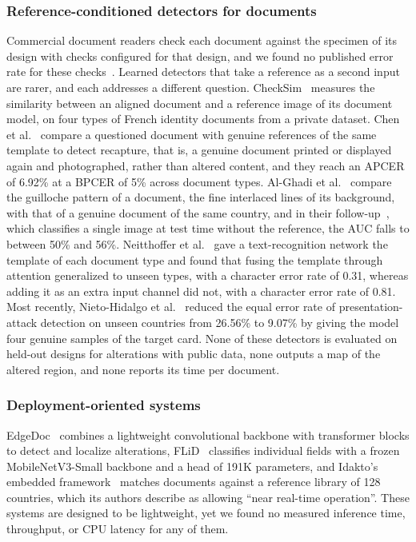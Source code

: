 \documentclass[12pt,a4paper]{article}
\begin{document}
\subsubsection{Reference-conditioned detectors for documents}
Commercial document readers check each document against the specimen of its design with checks configured for that design, and we found no published error rate for these checks~\cite{regula2023templates}. Learned detectors that take a reference as a second input are rarer, and each addresses a different question. CheckSim~\cite{ghanmi2021checksim} measures the similarity between an aligned document and a reference image of its document model, on four types of French identity documents from a private dataset. Chen et al.~\cite{chen2022domain} compare a questioned document with genuine references of the same template to detect recapture, that is, a genuine document printed or displayed again and photographed, rather than altered content, and they reach an APCER of 6.92\% at a BPCER of 5\% across document types. Al-Ghadi et al.~\cite{alghadi2022guilloche} compare the guilloche pattern of a document, the fine interlaced lines of its background, with that of a genuine document of the same country, and in their follow-up~\cite{alghadi2023fmidv}, which classifies a single image at test time without the reference, the AUC falls to between 50\% and 56\%. Neitthoffer et al.~\cite{neitthoffer2023knowledge} gave a text-recognition network the template of each document type and found that fusing the template through attention generalized to unseen types, with a character error rate of 0.31, whereas adding it as an extra input channel did not, with a character error rate of 0.81. Most recently, Nieto-Hidalgo et al.~\cite{nietohidalgo2026zeroshot} reduced the equal error rate of presentation-attack detection on unseen countries from 26.56\% to 9.07\% by giving the model four genuine samples of the target card. None of these detectors is evaluated on held-out designs for alterations with public data, none outputs a map of the altered region, and none reports its time per document.

\subsubsection{Deployment-oriented systems}
EdgeDoc~\cite{george2025edgedoc} combines a lightweight convolutional backbone with transformer blocks to detect and localize alterations, FLiD~\cite{flid2026} classifies individual fields with a frozen MobileNetV3-Small backbone and a head of 191K parameters, and Idakto's embedded framework~\cite{idakto2025embedded} matches documents against a reference library of 128 countries, which its authors describe as allowing ``near real-time operation''. These systems are designed to be lightweight, yet we found no measured inference time, throughput, or CPU latency for any of them.
\end{document}
